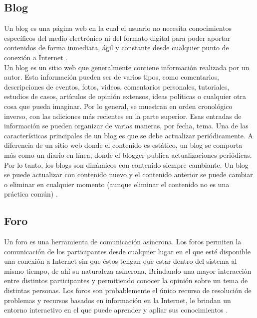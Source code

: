 
\subsection{Blog}

Un blog es una página web en la cual el usuario no necesita conocimientos específicos del medio electrónico ni del 
formato digital para poder aportar contenidos de forma inmediata, ágil y constante desde cualquier punto de conexión 
a Internet \citep{CT17}. \\
Un blog es un sitio web que generalmente contiene información realizada por un autor. Esta información pueden ser de varios 
tipos, como comentarios, descripciones de eventos, fotos, videos, comentarios personales, tutoriales, estudios de casos, artículos 
de opinión extensos, ideas políticas o cualquier otra cosa que pueda imaginar. Por lo general, se muestran en orden cronológico 
inverso, con las adiciones más recientes en la parte superior. Esas entradas de información se pueden organizar de varias maneras, por fecha, tema. 
Una de las características principales de un blog es que se debe actualizar periódicamente. A diferencia de un sitio web donde el 
contenido es estático, un blog se comporta más como un diario en línea, donde el blogger publica actualizaciones periódicas. Por lo 
tanto, los blogs son dinámicos con contenido siempre cambiante. Un blog se puede actualizar con contenido nuevo y el contenido anterior se 
puede cambiar o eliminar en cualquier momento (aunque eliminar el contenido no es una práctica común) \citep{CTBlog}.


\subsection{Foro}

Un foro es una herramienta de comunicación asíncrona. Los foros permiten la comunicación de los participantes desde 
cualquier lugar en el que  esté  disponible  una  conexión  a Internet  sin  que  éstos  tengan  que  estar dentro del 
sistema al mismo tiempo, de ahí su naturaleza asíncrona. Brindando una mayor interacción entre distintos 
participantes y permitiendo conocer la opinión sobre un tema de distintas personas.
Los foros son probablemente el único recurso de resolución de problemas y recursos basados en información en la Internet, 
le brindan un entorno interactivo en el que puede aprender y apliar sus conocimientos \citep{CTForum}.

